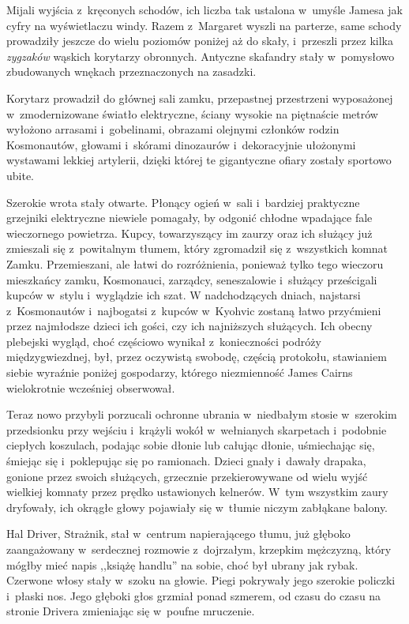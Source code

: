 \documentclass[oneside,polish,12pt,sfheadings]{mwbk}
\begin{document}
Mijali wyjścia z~kręconych schodów, ich liczba tak ustalona w~umyśle
Jamesa jak cyfry na wyświetlaczu windy. Razem z~Margaret wyszli na
parterze, same schody prowadziły jeszcze do wielu poziomów poniżej aż do
skały, i~przeszli przez kilka \emph{zygzaków} wąskich korytarzy
obronnych. Antyczne skafandry stały w~pomysłowo zbudowanych wnękach
przeznaczonych na zasadzki.

Korytarz prowadził do głównej sali zamku, przepastnej przestrzeni
wyposażonej w~zmodernizowane światło elektryczne, ściany wysokie na
piętnaście metrów wyłożono arrasami i~gobelinami, obrazami olejnymi
członków rodzin Kosmonautów, głowami i~skórami dinozaurów i~dekoracyjnie
ułożonymi wystawami lekkiej artylerii, dzięki której te gigantyczne
ofiary zostały sportowo ubite.

Szerokie wrota stały otwarte. Płonący ogień w~sali i~bardziej praktyczne
grzejniki elektryczne niewiele pomagały, by odgonić chłodne wpadające
fale wieczornego powietrza. Kupcy, towarzyszący im zaurzy oraz ich
służący już zmieszali się z~powitalnym tłumem, który zgromadził się z~wszystkich komnat Zamku. Przemieszani, ale łatwi do rozróżnienia,
ponieważ tylko tego wieczoru mieszkańcy zamku, Kosmonauci, zarządcy,
seneszalowie i~służący prześcigali kupców w~stylu i~wyglądzie ich szat.
W nadchodzących dniach, najstarsi z~Kosmonautów i~najbogatsi z~kupców w~Kyohvic zostaną łatwo przyćmieni przez najmłodsze dzieci ich gości, czy
ich najniższych służących. Ich obecny plebejski wygląd, choć częściowo
wynikał z~konieczności podróży międzygwiezdnej, był, przez oczywistą
swobodę, częścią protokołu, stawianiem siebie wyraźnie poniżej
gospodarzy, którego niezmienność James Cairns wielokrotnie wcześniej
obserwował.

Teraz nowo przybyli porzucali ochronne ubrania w~niedbałym stosie w~szerokim przedsionku przy wejściu i~krążyli wokół w~wełnianych
skarpetach i~podobnie ciepłych koszulach, podając sobie dłonie lub
całując dłonie, uśmiechając się, śmiejąc się i~poklepując się po
ramionach. Dzieci gnały i~dawały drapaka, gonione przez swoich
służących, grzecznie przekierowywane od wielu wyjść wielkiej komnaty
przez prędko ustawionych kelnerów. W~tym wszystkim zaury dryfowały, ich
okrągłe głowy pojawiały się w~tłumie niczym zabłąkane balony.

Hal Driver, Strażnik, stał w~centrum napierającego tłumu, już głęboko
zaangażowany w~serdecznej rozmowie z~dojrzałym, krzepkim mężczyzną,
który mógłby mieć napis ,,książę handlu'' na sobie, choć był ubrany jak
rybak. Czerwone włosy stały w~szoku na głowie. Piegi pokrywały jego
szerokie policzki i~płaski nos. Jego głęboki głos grzmiał ponad szmerem,
od czasu do czasu na stronie Drivera zmieniając się w~poufne mruczenie.
\end{document}
